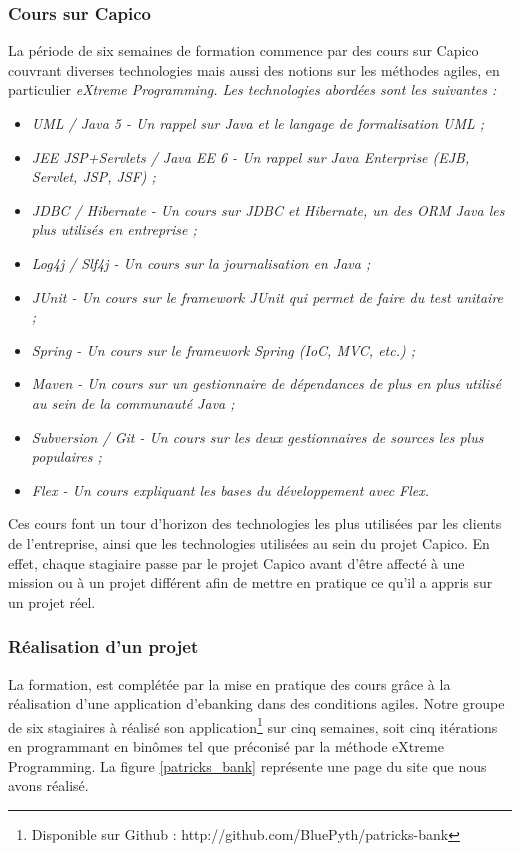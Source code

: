 \subsubsection{Cours sur Capico}
La période de six semaines de formation commence par des cours sur Capico couvrant diverses technologies mais aussi des notions sur les méthodes agiles, en particulier \em{eXtreme Programming}. Les technologies abordées sont les suivantes :

\begin{itemize}
  \item \em{UML / Java 5} - Un rappel sur Java et le langage de formalisation UML ;
  \item \em{JEE JSP+Servlets / Java EE 6} - Un rappel sur Java Enterprise (EJB, Servlet, JSP, JSF) ;
  \item \em{JDBC / Hibernate} - Un cours sur JDBC et Hibernate, un des ORM Java les plus utilisés en entreprise ;
  \item \em{Log4j / Slf4j} - Un cours sur la journalisation en Java ;
  \item \em{JUnit} - Un cours sur le framework JUnit qui permet de faire du test unitaire ;
  \item \em{Spring} - Un cours sur le framework Spring (IoC, MVC, etc.) ;
  \item \em{Maven} - Un cours sur un gestionnaire de dépendances de plus en plus utilisé au sein de la communauté Java ;
  \item \em{Subversion / Git} - Un cours sur les deux gestionnaires de sources les plus populaires ;
  \item \em{Flex} - Un cours expliquant les bases du développement avec Flex.
\end{itemize}

Ces cours font un tour d'horizon des technologies les plus utilisées par les clients de l'entreprise, ainsi que les technologies utilisées au sein du projet Capico. En effet, chaque stagiaire passe par le projet Capico avant d'être affecté à une mission ou à un projet différent afin de mettre en pratique ce qu'il a appris sur un projet réel.

\subsubsection{Réalisation d'un projet}

La formation, est complétée par la mise en pratique des cours grâce à la réalisation d'une application d'ebanking dans des conditions agiles. Notre groupe de six stagiaires à réalisé son application\footnote{Disponible sur Github : http://github.com/BluePyth/patricks-bank} sur cinq semaines, soit cinq itérations en programmant en binômes tel que préconisé par la méthode eXtreme Programming. La figure \ref{patricks_bank} représente une page du site que nous avons réalisé.

